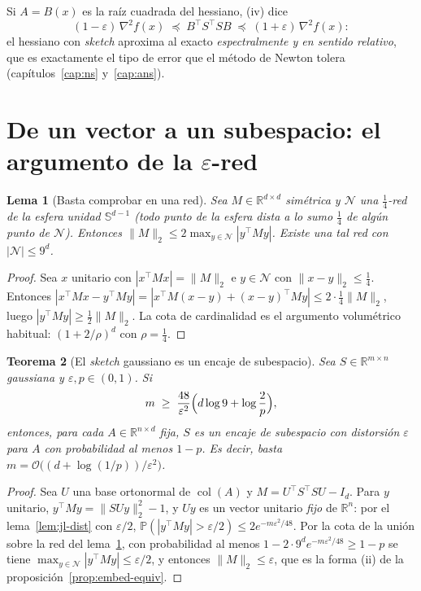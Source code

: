 \documentclass[11pt,a4paper,oneside]{book}
\newtheorem{teorema}{Teorema}[chapter]
\newtheorem{lema}[teorema]{Lema}
\theoremstyle{definition}
\theoremstyle{remark}
\newcommand{\R}{\mathbb{R}}
\newcommand{\Prob}{\mathbb{P}}
\newcommand{\cO}{\mathcal{O}}
\newcommand{\cN}{\mathcal{N}}
\newcommand{\T}{^{\top}}
\newcommand{\eps}{\varepsilon}
\newcommand{\nrm}[1]{\lVert #1\rVert}
\newcommand{\abs}[1]{\left\lvert #1\right\rvert}
\DeclareMathOperator{\col}{col}
\begin{document}
\begin{ideaclave}
Si $A=B(x)$ es la raíz cuadrada del hessiano, (iv) dice
\[ (1-\eps)\,\nabla^2 f(x)\;\preceq\;B\T S\T SB\;\preceq\;(1+\eps)\,\nabla^2 f(x): \]
el hessiano con \emph{sketch} aproxima al exacto \emph{espectralmente y en sentido relativo}, que es
exactamente el tipo de error que el método de Newton tolera (capítulos~\ref{cap:ns} y~\ref{cap:ans}).
\end{ideaclave}

\section{De un vector a un subespacio: el argumento de la \texorpdfstring{$\eps$}{eps}-red}

\begin{lema}[Basta comprobar en una red]\label{lem:red}
Sea $M\in\R^{d\times d}$ simétrica y $\cN$ una $\tfrac14$-red de la esfera unidad $\mathbb S^{d-1}$ (todo punto
de la esfera dista a lo sumo $\tfrac14$ de algún punto de $\cN$). Entonces $\nrm{M}_2\le2\max_{y\in\cN}\abs{y\T My}$.
Existe una tal red con $\abs{\cN}\le9^d$.
\end{lema}

\begin{proof}
Sea $x$ unitario con $\abs{x\T Mx}=\nrm{M}_2$ e $y\in\cN$ con $\nrm{x-y}_2\le\tfrac14$. Entonces
$\abs{x\T Mx-y\T My}=\abs{x\T M(x-y)+(x-y)\T My}\le2\cdot\tfrac14\nrm{M}_2$, luego $\abs{y\T My}\ge\tfrac12\nrm{M}_2$.
La cota de cardinalidad es el argumento volumétrico habitual: $(1+2/\rho)^d$ con $\rho=\tfrac14$.
\end{proof}

\begin{teorema}[El \emph{sketch} gaussiano es un encaje de subespacio]\label{teo:gauss-ose}
Sea $S\in\R^{m\times n}$ gaussiana y $\eps,p\in(0,1)$. Si
\[ m\;\ge\;\frac{48}{\eps^2}\Bigl(d\log9+\log\frac2p\Bigr), \]
entonces, para cada $A\in\R^{n\times d}$ fija, $S$ es un encaje de subespacio con distorsión $\eps$ para $A$ con
probabilidad al menos $1-p$. Es decir, basta $m=\cO\bigl((d+\log(1/p))/\eps^2\bigr)$.
\end{teorema}

\begin{proof}
Sea $U$ una base ortonormal de $\col(A)$ y $M=U\T S\T SU-I_d$. Para $y$ unitario,
$y\T My=\nrm{SUy}_2^2-1$, y $Uy$ es un vector unitario \emph{fijo} de $\R^n$: por el lema~\ref{lem:jl-dist} con
$\eps/2$, $\Prob(\abs{y\T My}>\eps/2)\le2e^{-m\eps^2/48}$. Por la cota de la unión sobre la red del
lema~\ref{lem:red}, con probabilidad al menos $1-2\cdot9^de^{-m\eps^2/48}\ge1-p$ se tiene
$\max_{y\in\cN}\abs{y\T My}\le\eps/2$, y entonces $\nrm{M}_2\le\eps$, que es la forma (ii) de la proposición~\ref{prop:embed-equiv}.
\end{proof}
\end{document}

